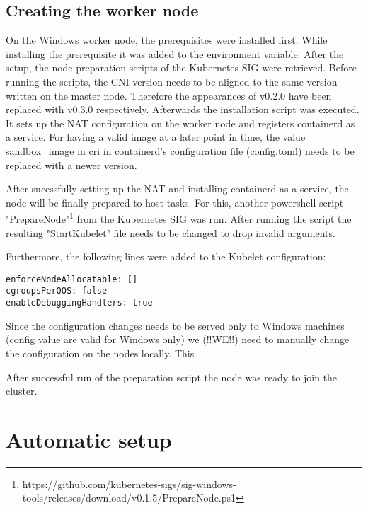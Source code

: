 \subsection{Creating the worker node}
On the Windows worker node, the prerequisites were installed first. While installing the prerequisite  it was added to the  environment variable. After the setup, the node preparation scripts of the Kubernetes \ac{SIG} were retrieved. Before running the scripts, the \ac{CNI} version needs to be aligned to the same version written on the master node. Therefore the appearances of v0.2.0 have been replaced with v0.3.0 respectively.
Afterwards the installation script was executed. It sets up the \ac{NAT} configuration on the worker node and registers containerd as a service.
For having a valid image at a later point in time, the value sandbox\_image in cri in containerd's configuration file (config.toml) needs to be replaced with a newer version.

After sucessfully setting up the \ac{NAT} and installing containerd as a service, the node will be finally prepared to host tasks. For this, another powershell script "PrepareNode"\footnote{https://github.com/kubernetes-sigs/sig-windows-tools/releases/download/v0.1.5/PrepareNode.ps1} from the Kubernetes \ac{SIG} was run. After running the script the resulting "StartKubelet" file needs to be changed to drop invalid arguments.

Furthermore, the following lines were added to the Kubelet configuration:
\begin{lstlisting}
enforceNodeAllocatable: []
cgroupsPerQOS: false
enableDebuggingHandlers: true
\end{lstlisting}
Since the configuration changes needs to be served only to Windows machines (config value are valid for Windows only) we (!!WE!!) need to manually change the configuration on the nodes locally. This


After successful run of the preparation script the node was ready to join the cluster.


\section{Automatic setup}



